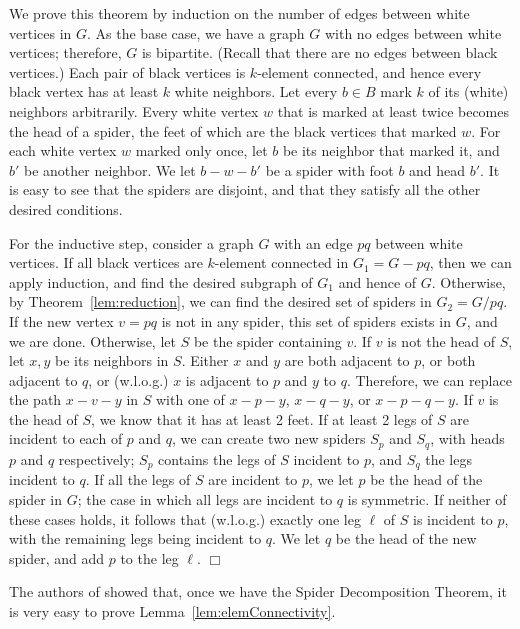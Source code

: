 \documentclass[11pt]{article}
\renewenvironment{proof}{\vspace{-0.1in}\noindent{\bf Proof:}}{\hspace*{\fill}$\Box$\par}
\begin{document}
\begin{proof}
  We prove this theorem by induction on the number of edges between
  white vertices in $G$. As the base case, we have a graph $G$ with no
  edges between white vertices; therefore, $G$ is bipartite. (Recall
  that there are no edges between black vertices.)  Each pair of black
  vertices is $k$-element connected, and hence every black vertex has
  at least $k$ white neighbors. Let every $b \in B$ mark $k$ of its
  (white) neighbors arbitrarily. Every white vertex $w$ that is marked
  at least twice becomes the head of a spider, the feet of which are
  the black vertices that marked $w$. For each white vertex $w$ marked
  only once, let $b$ be its neighbor that marked it, and $b'$ be
  another neighbor. We let $b-w-b'$ be a spider with foot $b$ and head
  $b'$. It is easy to see that the spiders are disjoint, and that they
  satisfy all the other desired conditions.

  For the inductive step, consider a graph $G$ with an edge $pq$
  between white vertices. If all black vertices are $k$-element
  connected in $G_1 = G - pq$, then we can apply induction, and find
  the desired subgraph of $G_1$ and hence of $G$. Otherwise, by
  Theorem~\ref{lem:reduction}, we can find the desired set of spiders
  in $G_2 = G / pq$. If the new vertex $v = pq$ is not in any spider,
  this set of spiders exists in $G$, and we are done. Otherwise, let
  $S$ be the spider containing $v$. If $v$ is not the head of $S$, let
  $x,y$ be its neighbors in $S$. Either $x$ and $y$ are both adjacent
  to $p$, or both adjacent to $q$, or (w.l.o.g.) $x$ is adjacent to
  $p$ and $y$ to $q$. Therefore, we can replace the path $x-v-y$ in
  $S$ with one of $x-p-y$, $x-q-y$, or $x-p-q-y$.  If $v$ is the head
  of $S$, we know that it has at least 2 feet. If at least 2 legs of
  $S$ are incident to each of $p$ and $q$, we can create two new
  spiders $S_p$ and $S_q$, with heads $p$ and $q$ respectively; $S_p$
  contains the legs of $S$ incident to $p$, and $S_q$ the legs
  incident to $q$. If all the legs of $S$ are incident to $p$, we let
  $p$ be the head of the spider in $G$; the case in which all legs are
  incident to $q$ is symmetric. If neither of these cases holds, it
  follows that (w.l.o.g.)  exactly one leg $\ell$ of $S$ is incident
  to $p$, with the remaining legs being incident to $q$. We let $q$ be
  the head of the new spider, and add $p$ to the leg $\ell$.
\end{proof}

The authors of \cite{ChuzhoyK08} showed that, once we have the Spider
Decomposition Theorem, it is very easy to prove
Lemma~\ref{lem:elemConnectivity}.
\end{document}
